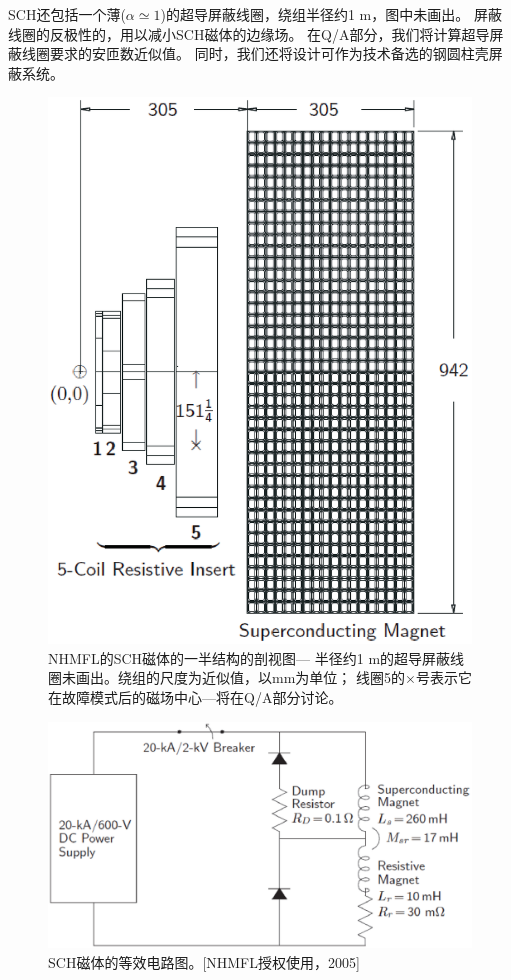 SCH还包括一个薄($\alpha\simeq 1$)的超导屏蔽线圈，绕组半径约1 m，图中未画出。
屏蔽线圈的反极性的，用以减小SCH磁体的边缘场。
在Q/A部分，我们将计算超导屏蔽线圈要求的安匝数近似值。
同时，我们还将设计可作为技术备选的钢圆柱壳屏蔽系统。
\begin{figure}[htbp]
	\centering
	\includegraphics[scale=0.7]{chpt9/figs/fig9.1.eps}
	\caption{NHMFL的SCH磁体的一半结构的剖视图---
		半径约1 m的超导屏蔽线圈未画出。绕组的尺度为近似值，以mm为单位；
	线圈5的$\times$号表示它在故障模式后的磁场中心---将在Q/A部分讨论。}
\end{figure}

\begin{figure}[htbp]
	\centering
	\includegraphics[scale=0.6]{chpt9/figs/fig9.2.eps}
	\caption{SCH磁体的等效电路图。[NHMFL授权使用，2005]}
\end{figure}


